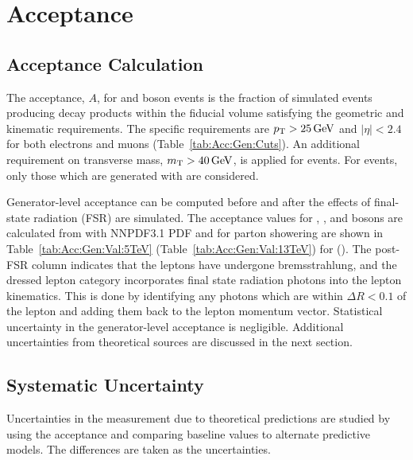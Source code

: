 \chapter{Acceptance}\label{ch:acceptance}

\section{Acceptance Calculation}
The acceptance, $A$, for \Wpm and \Z boson events is the fraction of simulated events producing decay products within the fiducial volume satisfying the geometric and kinematic requirements. The specific requirements are $p_{\mathrm{T}}>25\,\text{Ge\hspace{-.08em}V}$ and $|\eta| < 2.4$ for both electrons and muons (Table~\ref{tab:Acc:Gen:Cuts}). An additional requirement on transverse mass, $m_{\mathrm{T}} > 40 \,\text{Ge\hspace{-.08em}V}$, is
applied for \Wpm events. For \Z events, only those which are generated with \masswindow are considered.

Generator-level acceptance can be computed before and after the effects of final-state radiation (FSR) are simulated. The acceptance values for \Wp, \Wm, and \Z bosons are calculated from \aMCATNLO with NNPDF3.1 PDF and  for parton showering are shown in Table~\ref{tab:Acc:Gen:Val:5TeV} (Table~\ref{tab:Acc:Gen:Val:13TeV}) for \sg (\sh). The post-FSR column indicates that the leptons have undergone bremsstrahlung, and the dressed lepton category incorporates final state radiation photons into the lepton kinematics. This is done by identifying any photons which are within $\Delta R < 0.1$ of the lepton and adding them back to the lepton momentum vector. Statistical uncertainty in the generator-level acceptance is negligible. Additional uncertainties from theoretical sources are discussed in the next section.



% 
% 

\section{Systematic Uncertainty}\label{ch:acc:unc}
Uncertainties in the measurement due to theoretical predictions are studied by using the acceptance and comparing baseline values to alternate predictive models. The differences are taken as the uncertainties.



